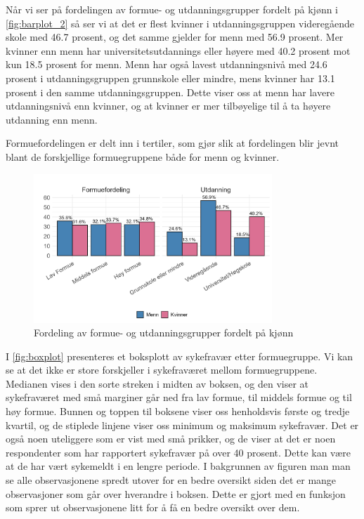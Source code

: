 \documentclass[
  12pt,
  a4paper,
  DIV=11,
  numbers=noendperiod]{scrartcl}
\begin{document}
Når vi ser på fordelingen av formue- og utdanningsgrupper fordelt på
kjønn i \autoref{fig:barplot_2} så ser vi at det er flest kvinner i
utdanningsgruppen videregående skole med 46.7 prosent, og det samme
gjelder for menn med 56.9 prosent. Mer kvinner enn menn har
universitetsutdannings eller høyere med 40.2 prosent mot kun 18.5
prosent for menn. Menn har også lavest utdanningsnivå med 24.6 prosent i
utdanningsgruppen grunnskole eller mindre, mens kvinner har 13.1 prosent
i den samme utdanningsgruppen. Dette viser oss at menn har lavere
utdanningsnivå enn kvinner, og at kvinner er mer tilbøyelige til å ta
høyere utdanning enn menn.

Formuefordelingen er delt inn i tertiler, som gjør slik at fordelingen
blir jevnt blant de forskjellige formuegruppene både for menn og
kvinner.

\begin{figure}[H]
\caption{Fordeling av formue- og utdanningsgrupper fordelt på kjønn}
\label{fig:barplot_2}
\centering
\includegraphics[width=0.8\textwidth]{dokumentobjekter/figurer/fig_5.png}
\end{figure}

I \autoref{fig:boxplot} presenteres et boksplott av sykefravær etter
formuegruppe. Vi kan se at det ikke er store forskjeller i sykefraværet
mellom formuegruppene. Medianen vises i den sorte streken i midten av
boksen, og den viser at sykefraværet med små marginer går ned fra lav
formue, til middels formue og til høy formue. Bunnen og toppen til
boksene viser oss henholdsvis første og tredje kvartil, og de stiplede
linjene viser oss minimum og maksimum sykefravær. Det er også noen
uteliggere som er vist med små prikker, og de viser at det er noen
respondenter som har rapportert sykefravær på over 40 prosent. Dette kan
være at de har vært sykemeldt i en lengre periode. I bakgrunnen av
figuren man man se alle observasjonene spredt utover for en bedre
oversikt siden det er mange observasjoner som går over hverandre i
boksen. Dette er gjort med en funksjon som sprer ut observasjonene litt
for å få en bedre oversikt over dem.
\end{document}

